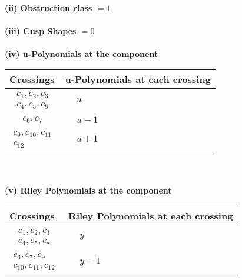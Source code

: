 \documentclass[1p]{elsarticle_modified}
\theoremstyle{definition}
\begin{document}
\flushleft \textbf{(ii) Obstruction class $= 1$}\\~\\
\flushleft \textbf{(iii) Cusp Shapes $= 0$}\\~\\
\newpage\renewcommand{\arraystretch}{1}
\flushleft \textbf{(iv) u-Polynomials at the component}\newline \\
\begin{tabular}{m{50pt}|m{274pt}}
Crossings & \hspace{64pt}u-Polynomials at each crossing \\
\hline $$\begin{aligned}c_{1},c_{2},c_{3}\\c_{4},c_{5},c_{8}\end{aligned}$$&$\begin{aligned}
&u
\end{aligned}$\\
\hline $$\begin{aligned}c_{6},c_{7}\end{aligned}$$&$\begin{aligned}
&u-1
\end{aligned}$\\
\hline $$\begin{aligned}c_{9},c_{10},c_{11}\\c_{12}\end{aligned}$$&$\begin{aligned}
&u+1
\end{aligned}$\\
\hline
\end{tabular}\\~\\
\newpage\renewcommand{\arraystretch}{1}
\flushleft \textbf{(v) Riley Polynomials at the component}\newline \\
\begin{tabular}{m{50pt}|m{274pt}}
Crossings & \hspace{64pt}Riley Polynomials at each crossing \\
\hline $$\begin{aligned}c_{1},c_{2},c_{3}\\c_{4},c_{5},c_{8}\end{aligned}$$&$\begin{aligned}
&y
\end{aligned}$\\
\hline $$\begin{aligned}c_{6},c_{7},c_{9}\\c_{10},c_{11},c_{12}\end{aligned}$$&$\begin{aligned}
&y-1
\end{aligned}$\\
\hline
\end{tabular}\\~\\
\end{document}
